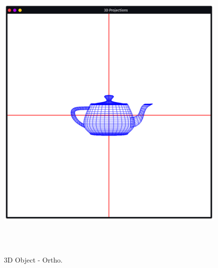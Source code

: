 \documentclass[12pt, a4]{article}
\begin{document}
\subsection*{}
\begin{figure}[h]
\centering
\caption{3D Object - Ortho.}
\includegraphics[height=15cm, width=15cm]{Outputs/Ortho1.png}
\end{figure}

\newpage
\end{document}
